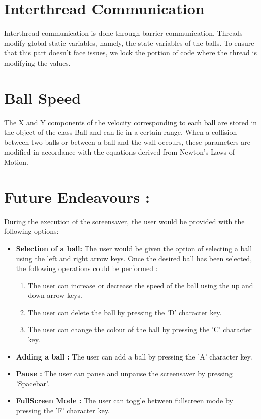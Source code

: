 \documentclass[]{article}
\begin{document}
\section{Interthread Communication}
Interthread communication is done through barrier communication. Threads modify global static variables, namely, the state variables of the balls.
To ensure that this part doesn't face issues, we lock the portion of code where the thread is modifying the values.
\begin{flushleft}

\end{flushleft}
\section{Ball Speed}
\begin{flushleft}
The X and Y components of the velocity corresponding to each ball are stored in the  object of the class Ball and can lie in a certain range. When a collision between two balls or between a ball and the wall occours, these parameters are modified in accordance with the equations derived from Newton's Laws of Motion.  
\end{flushleft}

\section{Future Endeavours :}
\begin{flushleft} 
During the execution of the screensaver, the user would be provided with the following options:
\begin{itemize}
\item \textbf{Selection of a ball:}
The user would be given the option of selecting a ball using the left and right arrow keys. Once the desired ball has been selected, the following operations could be performed :
\begin{enumerate}

\item The user can increase or decrease the speed of the ball using the up and down arrow keys. 

\item The user can delete the ball by pressing the 'D' character key. 

\item The user can change the colour of the ball by pressing the 'C' character key.
\end{enumerate}

\item \textbf{Adding a ball :}
The user can add a ball by pressing the 'A' character key.

\item\textbf{Pause :}
The user can pause and unpause the screensaver by pressing 'Spacebar'.

\item \textbf{FullScreen Mode :}
The user can toggle between fullscreen mode by pressing the 'F' character key.

\end{itemize}
\end{flushleft}
\end{document}
